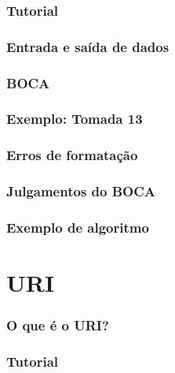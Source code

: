 \documentclass[utf8, usepdftitle=false, svgnames, color={table, fixpdftex, hyperref, fixinclude, xcdraw}, t, brazil]{beamer}
\begin{document}
 \section{Tutorial}
 

 \section{Entrada e saída de dados}
 
 
 \section{BOCA}
 
 
 \section{Exemplo: Tomada 13}
 
 
 \section{Erros de formatação}
 
 
 \section{Julgamentos do BOCA}
 
 
 \section{Exemplo de algoritmo}
 
 
 \part{URI}
 
 \section{O que é o URI?}
 
 
 \section{Tutorial}
 
 
\end{document}
